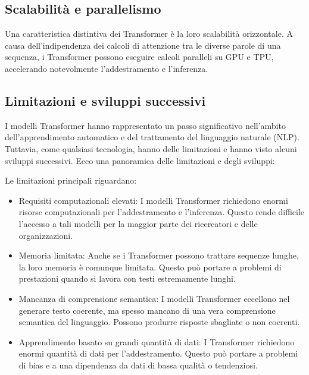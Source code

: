 \subsection{Scalabilità e parallelismo}
Una caratteristica distintiva dei Transformer è la loro scalabilità orizzontale. A causa dell'indipendenza dei calcoli di attenzione tra le diverse parole di una sequenza, i Transformer possono eseguire calcoli paralleli su GPU e TPU, accelerando notevolmente l'addestramento e l'inferenza.

\subsection{Limitazioni e sviluppi successivi}
I modelli Transformer hanno rappresentato un passo significativo nell'ambito dell'apprendimento automatico e del trattamento del linguaggio naturale (NLP). Tuttavia, come qualsiasi tecnologia, hanno delle limitazioni e hanno visto alcuni sviluppi successivi. Ecco una panoramica delle limitazioni e degli sviluppi:

Le limitazioni principali riguardano:
\begin{itemize}
    \item Requisiti computazionali elevati: I modelli Transformer richiedono enormi risorse computazionali per l'addestramento e l'inferenza. Questo rende difficile l'accesso a tali modelli per la maggior parte dei ricercatori e delle organizzazioni.
    \item Memoria limitata: Anche se i Transformer possono trattare sequenze lunghe, la loro memoria è comunque limitata. Questo può portare a problemi di prestazioni quando si lavora con testi estremamente lunghi.
    \item Mancanza di comprensione semantica: I modelli Transformer eccellono nel generare testo coerente, ma spesso mancano di una vera comprensione semantica del linguaggio. Possono produrre risposte sbagliate o non coerenti.
    \item Apprendimento basato su grandi quantità di dati: I Transformer richiedono enormi quantità di dati per l'addestramento. Questo può portare a problemi di bias e a una dipendenza da dati di bassa qualità o tendenziosi.
\end{itemize}

